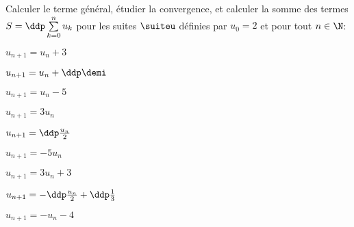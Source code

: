 
\begin{exercice} \;
Calculer le terme g\'en\'eral, \'etudier la convergence, et calculer la somme des termes $S=\ddp \sum\limits_{k=0}^n u_k$ pour les suites $\suiteu$ d\'efinies par $u_0=2$ et pour tout $n\in\N$:\\
\begin{enumerate}
\begin{minipage}[t]{0.3\textwidth}
\item 
$u_{n+1}=u_n+3$
\item $u_{n+1}=u_n+\ddp\demi$  
\item  
$u_{n+1}=u_n-5$
\end{minipage}
\begin{minipage}[t]{0.3\textwidth}
\item
$u_{n+1}=3u_n$ 
\item
$u_{n+1}=\ddp\frac{u_n}{2}$   
\item  
$u_{n+1}=-5u_n$ 
\end{minipage}
\begin{minipage}[t]{0.3\textwidth}
\item
$u_{n+1}=3u_n+3$  
\item
$u_{n+1}=-\ddp\frac{u_n}{2}+\ddp\frac{1}{3}$   
\item  
$u_{n+1}=-u_n  -4$ 
\end{minipage}
\end{enumerate}
\end{exercice}